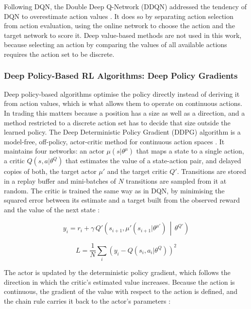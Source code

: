 Following DQN, the Double Deep Q-Network (DDQN) addressed the tendency of DQN to overestimate action values \cite{van_hasselt_deep_2016}. It does so by separating action selection from action evaluation, using the online network to choose the action and the target network to score it. Deep value-based methods are not used in this work, because selecting an action by comparing the values of all available actions requires the action set to be discrete.

\subsubsection{Deep Policy-Based RL Algorithms: Deep Policy Gradients}

Deep policy-based algorithms optimise the policy directly instead of deriving it from action values, which is what allows them to operate on continuous actions. In trading this matters because a position has a size as well as a direction, and a method restricted to a discrete action set has to decide that size outside the learned policy. The Deep Deterministic Policy Gradient (DDPG) algorithm is a model-free, off-policy, actor-critic method for continuous action spaces \cite{lillicrap_continuous_2015}. It maintains four networks: an actor \( \mu(s | \theta^{\mu}) \) that maps a state to a single action, a critic \( Q(s, a | \theta^{Q}) \) that estimates the value of a state-action pair, and delayed copies of both, the target actor \( \mu' \) and the target critic \( Q' \). Transitions are stored in a replay buffer and mini-batches of \( N \) transitions are sampled from it at random. The critic is trained the same way as in DQN, by minimising the squared error between its estimate and a target built from the observed reward and the value of the next state \cite{lillicrap_continuous_2015}:

\begin{equation}
y_i = r_i + \gamma \, Q'\!\left(s_{i+1}, \mu'(s_{i+1} | \theta^{\mu'}) \,\middle|\, \theta^{Q'}\right)
\label{Equation:DDPGTarget}
\end{equation}

\begin{equation}
L = \frac{1}{N} \sum_{i} \left( y_i - Q(s_i, a_i | \theta^{Q}) \right)^2
\label{Equation:DDPGCriticLoss}
\end{equation}

The actor is updated by the deterministic policy gradient, which follows the direction in which the critic's estimated value increases. Because the action is continuous, the gradient of the value with respect to the action is defined, and the chain rule carries it back to the actor's parameters \cite{lillicrap_continuous_2015}:


